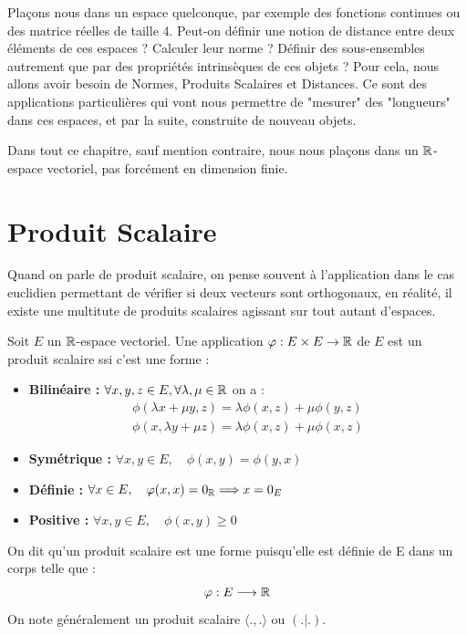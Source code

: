 
\minitoc  %

Plaçons nous dans un espace quelconque, par exemple des fonctions continues ou des matrice réelles de taille 4. 
Peut-on définir une notion de distance entre deux éléments de ces espaces ? Calculer leur norme ? 
Définir des sous-ensembles autrement que par des propriétés intrinsèques de ces objets ? 
Pour cela, nous allons avoir besoin de Normes, Produits Scalaires et Distances. 
Ce sont des applications particulières qui vont nous permettre de "mesurer" des "longueurs" dans ces espaces, 
et par la suite, construite de nouveau objets. 

\vspace{0.3cm}

Dans tout ce chapitre, sauf mention contraire, nous nous plaçons dans un $\mathbb{R}$-espace vectoriel, pas forcément en dimension finie. 



\section{Produit Scalaire}

Quand on parle de produit scalaire, on pense souvent à l'application dans le cas euclidien permettant de vérifier si 
deux vecteurs sont orthogonaux, en réalité, il existe une multitute de produits scalaires agissant sur tout autant d'espaces. 

\begin{definition}
    Soit $E$ un $\mathbb{R}$-espace vectoriel. Une application $\varphi : E \times E \rightarrow \mathbb{R}$ de $E$ est un produit scalaire ssi c'est une forme :
    \begin{itemize}
        \item \textbf{Bilinéaire :} $ \forall x,y,z \in E, \forall \lambda,\mu \in \mathbb{R}$ on a :
            \begin{align}
                \phi(\lambda x + \mu y,z) = \lambda \phi(x,z) + \mu \phi(y,z) \\ 
                \phi(x,\lambda y + \mu z) = \lambda \phi(x,z) + \mu \phi(x,z)
            \end{align}
        \item \textbf{Symétrique :} $ \forall x,y \in E, \quad \phi(x,y) = \phi(y,x)$ 
        \item \textbf{Définie :} $ \forall x \in E, \quad \varphi(x,x) = 0_{\mathbb{R}} \Longrightarrow x = 0_E $
        \item \textbf{Positive :} $ \forall x,y \in E, \quad \phi(x,y) \geq 0 $
    \end{itemize}
    On dit qu'un produit scalaire est une forme puisqu'elle est définie de E dans un corps telle que : 
        \[ \varphi : E \longrightarrow \mathbb{R} \] 
    On note généralement un produit scalaire $ \langle .,. \rangle$ ou $(.|.)$. 
\end{definition}

